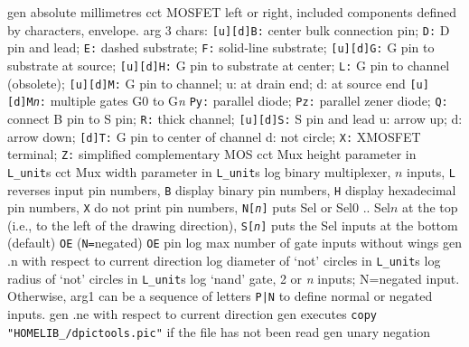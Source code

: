   {gen}
  {absolute millimetres}
  {cct}
  {MOSFET left or right, included components defined by characters, envelope.
   arg 3 chars:
      {\tt [u][d]B:} center bulk connection pin;
      {\tt D:} D pin and lead;
      {\tt E:} dashed substrate;
      {\tt F:} solid-line substrate;
      {\tt [u][d]G:} G pin to substrate at source;
      {\tt [u][d]H:} G pin to substrate at center;
      {\tt L:} G pin to channel (obsolete);
      {\tt [u][d]M:} G pin to channel; u: at drain end; d: at source end
      {\tt [u][d]M{\sl n}:} multiple gates G0 to G{\sl n}
      {\tt Py:} parallel diode;
      {\tt Pz:} parallel zener diode;
      {\tt Q:} connect B pin to S pin;
      {\tt R:} thick channel;
      {\tt [u][d]S:} S pin and lead u: arrow up; d: arrow down;
      {\tt [d]T:} G pin to center of channel d: not circle;
      {\tt X:} XMOSFET terminal;
      {\tt Z:} simplified complementary MOS
    }
  {cct}
  {Mux height parameter in {\tt L\_unit}s}
  {cct}
  {Mux width parameter in {\tt L\_unit}s}
  {log}
  {binary multiplexer, $n$ inputs,
    {\tt L} reverses input pin numbers,
    {\tt B} display binary pin numbers,
    {\tt H} display hexadecimal pin numbers,
    {\tt X} do not print pin numbers,
    {\tt N[{\sl n}]} puts Sel or Sel$0$ .. Sel$n$ at the top
    (i.e., to the left of the drawing direction),
    {\tt S[{\sl n}]} puts the Sel inputs at the bottom (default)
    {\tt OE} ({\tt N=}negated) {\tt OE} pin
    }
  {log}
  {max number of gate inputs without wings}
%
  {gen}
  {.n with respect to current direction}
  {log}
  {diameter of `not' circles in {\tt L\_unit}s}
  {log}
  {radius of `not' circles in {\tt L\_unit}s}
  {log}
  {`nand' gate, 2 or {\sl n\/} inputs; N=negated input.
   Otherwise, arg1 can be a sequence of letters {\tt P|N}
   to define normal or negated inputs.
    }
  {gen}
  {.ne with respect to current direction}
  {gen}
  {executes {\tt copy "HOMELIB\_/dpictools.pic"} if the file has not been read}
  {gen}
  {unary negation}
